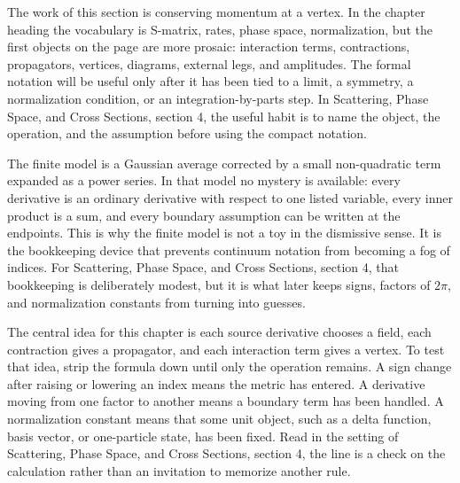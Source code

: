 











The work of this section is conserving momentum at a vertex.  In the chapter heading the vocabulary is S-matrix, rates, phase space, normalization, but the first objects on the page are more prosaic: interaction terms, contractions, propagators, vertices, diagrams, external legs, and amplitudes.  The formal notation will be useful only after it has been tied to a limit, a symmetry, a normalization condition, or an integration-by-parts step.  In Scattering, Phase Space, and Cross Sections, section 4, the useful habit is to name the object, the operation, and the assumption before using the compact notation.

The finite model is a Gaussian average corrected by a small non-quadratic term expanded as a power series.  In that model no mystery is available: every derivative is an ordinary derivative with respect to one listed variable, every inner product is a sum, and every boundary assumption can be written at the endpoints.  This is why the finite model is not a toy in the dismissive sense.  It is the bookkeeping device that prevents continuum notation from becoming a fog of indices.  For Scattering, Phase Space, and Cross Sections, section 4, that bookkeeping is deliberately modest, but it is what later keeps signs, factors of \(2\pi\), and normalization constants from turning into guesses.

The central idea for this chapter is each source derivative chooses a field, each contraction gives a propagator, and each interaction term gives a vertex.  To test that idea, strip the formula down until only the operation remains.  A sign change after raising or lowering an index means the metric has entered.  A derivative moving from one factor to another means a boundary term has been handled.  A normalization constant means that some unit object, such as a delta function, basis vector, or one-particle state, has been fixed.  Read in the setting of Scattering, Phase Space, and Cross Sections, section 4, the line is a check on the calculation rather than an invitation to memorize another rule.

